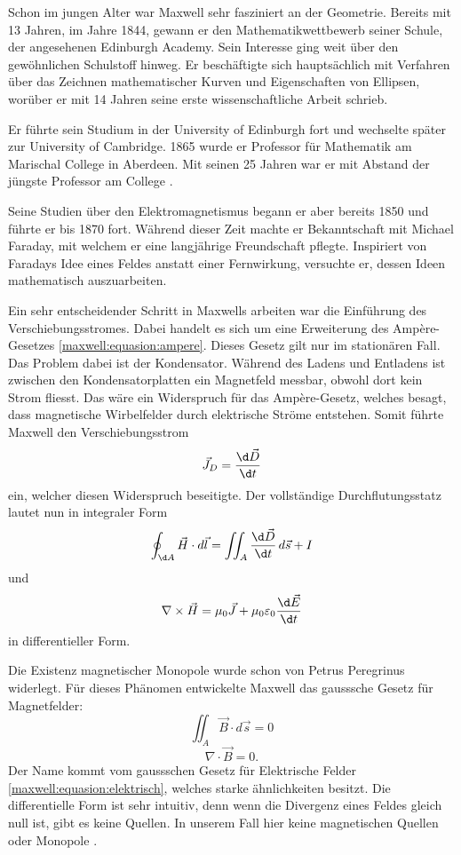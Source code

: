 Schon im jungen Alter war Maxwell sehr fasziniert an der Geometrie. Bereits mit 13 Jahren, im Jahre 1844, gewann er den Mathematikwettbewerb seiner Schule, der angesehenen Edinburgh Academy.
Sein Interesse ging weit über den gewöhnlichen Schulstoff hinweg.
Er beschäftigte sich hauptsächlich mit Verfahren über das Zeichnen mathematischer Kurven und Eigenschaften von Ellipsen, worüber er mit 14 Jahren seine erste wissenschaftliche Arbeit schrieb.

Er führte sein Studium in der University of Edinburgh fort und wechselte später zur University of Cambridge.
1865 wurde er Professor für Mathematik am Marischal College in Aberdeen.
Mit seinen 25 Jahren war er mit Abstand der jüngste Professor am College \cite{maxwell:maxwell}.

Seine Studien über den Elektromagnetismus begann er aber bereits 1850 und führte er bis 1870 fort. 
Während dieser Zeit machte er Bekanntschaft mit Michael Faraday, mit welchem er eine langjährige Freundschaft pflegte.
Inspiriert von Faradays Idee eines Feldes anstatt einer Fernwirkung, versuchte er, dessen Ideen mathematisch auszuarbeiten.

Ein sehr entscheidender Schritt in Maxwells arbeiten war die Einführung des Verschiebungsstromes.
Dabei handelt es sich um eine Erweiterung des Ampère-Gesetzes \eqref{maxwell:equasion:ampere}.
Dieses Gesetz gilt nur im stationären Fall.
Das Problem dabei ist der Kondensator.
Während des Ladens und Entladens ist zwischen den Kondensatorplatten ein Magnetfeld messbar, obwohl dort kein Strom fliesst.
Das wäre ein Widerspruch für das Ampère-Gesetz, welches besagt, dass magnetische Wirbelfelder durch elektrische Ströme entstehen.
Somit führte Maxwell den Verschiebungsstrom
\[
\vec{J}_D = \frac{\d \vec{D}}{\d t}
\]
ein, welcher diesen Widerspruch beseitigte.
Der vollständige Durchflutungsstatz lautet nun in integraler Form
\[
\oint_{\d A}
\vec{H}
\cdot
d\vec{l}
=
\iint_{A}
\frac{\d \vec{D}}{\d t} 
\,
d\vec{s}
+
I
\]
und 
\[
\nabla
\times
\vec{H}
=
\mu_0 \vec{J}
+
\mu_0 \varepsilon_0 \frac{\d \vec{E}}{\d t}
\]
in differentieller Form.

Die Existenz magnetischer Monopole wurde schon von Petrus Peregrinus widerlegt.
Für dieses Phänomen entwickelte Maxwell das gausssche Gesetz für Magnetfelder:
\[
\iint_{A}
\vec{B} \cdot d\vec{s}
=
0
\]
\[
\nabla \cdot \vec{B} = 0 .
\]
Der Name kommt vom gaussschen Gesetz für Elektrische Felder \eqref{maxwell:equasion:elektrisch}, welches starke ähnlichkeiten besitzt.
Die differentielle Form ist sehr intuitiv, denn wenn die Divergenz eines Feldes gleich null ist, gibt es keine Quellen. 
In unserem Fall hier keine magnetischen Quellen oder Monopole \cite{maxwell:equasions}.

